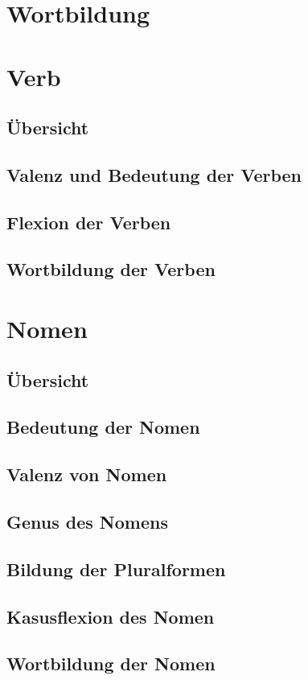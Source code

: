 \documentclass{report}
\begin{document}
	\section{Wortbildung}
	\section{Verb}
		\subsection{Übersicht}
		\subsection{Valenz und Bedeutung der Verben}
		\subsection{Flexion der Verben}
		\subsection{Wortbildung der Verben}
	\section{Nomen}
		\subsection{Übersicht}
		\subsection{Bedeutung der Nomen}
		\subsection{Valenz von Nomen}
		\subsection{Genus des Nomens}
		\subsection{Bildung der Pluralformen}
		\subsection{Kasusflexion des Nomen}
		\subsection{Wortbildung der Nomen}
\end{document}
